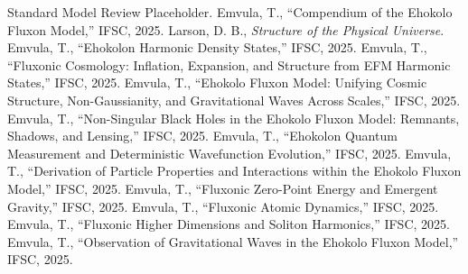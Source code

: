 \documentclass[11pt]{article}
\begin{document}
\begin{thebibliography}{9}
 Standard Model Review Placeholder.
 Emvula, T., ``Compendium of the Ehokolo Fluxon Model,'' IFSC, 2025.
 Larson, D. B., \textit{Structure of the Physical Universe}.
 Emvula, T., ``Ehokolon Harmonic Density States,'' IFSC, 2025.
 Emvula, T., ``Fluxonic Cosmology: Inflation, Expansion, and Structure from EFM Harmonic States,'' IFSC, 2025.
 Emvula, T., ``Ehokolo Fluxon Model: Unifying Cosmic Structure, Non-Gaussianity, and Gravitational Waves Across Scales,'' IFSC, 2025.
 Emvula, T., ``Non-Singular Black Holes in the Ehokolo Fluxon Model: Remnants, Shadows, and Lensing,'' IFSC, 2025.
 Emvula, T., ``Ehokolon Quantum Measurement and Deterministic Wavefunction Evolution,'' IFSC, 2025.
 Emvula, T., ``Derivation of Particle Properties and Interactions within the Ehokolo Fluxon Model,'' IFSC, 2025.
 Emvula, T., ``Fluxonic Zero-Point Energy and Emergent Gravity,'' IFSC, 2025.
 Emvula, T., ``Fluxonic Atomic Dynamics,'' IFSC, 2025.
 Emvula, T., ``Fluxonic Higher Dimensions and Soliton Harmonics,'' IFSC, 2025.
 Emvula, T., ``Observation of Gravitational Waves in the Ehokolo Fluxon Model,'' IFSC, 2025.
\end{thebibliography}
\end{document}
